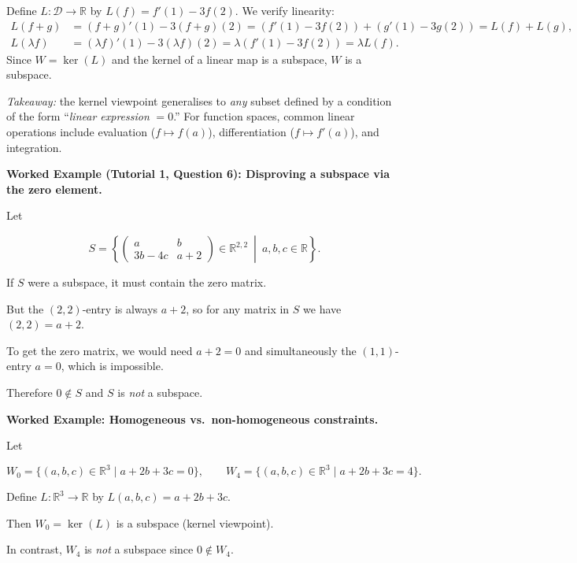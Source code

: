 \begin{extension}[title={Extension (Tutorial 1, Question 2, Method 2: Kernel of a linear functional)}]
Define $L:\mathcal{D}\to\mathbb{R}$ by $L(f)=f'(1)-3f(2)$.  We verify linearity:
\begin{align*}
L(f+g) &= (f+g)'(1)-3(f+g)(2) = (f'(1)-3f(2))+(g'(1)-3g(2))=L(f)+L(g),\\
L(\lambda f)&=(\lambda f)'(1)-3(\lambda f)(2)=\lambda(f'(1)-3f(2))=\lambda L(f).
\end{align*}
Since $W=\ker(L)$ and the kernel of a linear map is a subspace, $W$ is a subspace.

\medskip
\emph{Takeaway:} the kernel viewpoint generalises to \emph{any} subset defined by a condition of the form ``\emph{linear expression} $=0$.''  For function spaces, common linear operations include evaluation ($f\mapsto f(a)$), differentiation ($f\mapsto f'(a)$), and integration.
\end{extension}

\begin{examplebox}

\textbf{Worked Example (Tutorial 1, Question 6): Disproving a subspace via the zero element.}

Let

\[
S=\left\{
\begin{pmatrix}
a & b\\
3b-4c & a+2
\end{pmatrix}
\in \mathbb{R}^{2,2}
\ \middle|\ a,b,c\in\mathbb{R}
\right\}.
\]

If $S$ were a subspace, it must contain the zero matrix.

But the $(2,2)$-entry is always $a+2$, so for any matrix in $S$ we have $(2,2)=a+2$.

To get the zero matrix, we would need $a+2=0$ and simultaneously the $(1,1)$-entry $a=0$, which is impossible.

Therefore $0\notin S$ and $S$ is \emph{not} a subspace.

\end{examplebox}

\begin{examplebox}

\textbf{Worked Example: Homogeneous vs.\ non-homogeneous constraints.}

Let

\[
W_0=\{(a,b,c)\in\mathbb{R}^3 \mid a+2b+3c=0\},\qquad
W_4=\{(a,b,c)\in\mathbb{R}^3 \mid a+2b+3c=4\}.
\]

Define $L:\mathbb{R}^3\to\mathbb{R}$ by $L(a,b,c)=a+2b+3c$.

Then $W_0=\ker(L)$ is a subspace (kernel viewpoint).

In contrast, $W_4$ is \emph{not} a subspace since $0\notin W_4$.

\end{examplebox}

